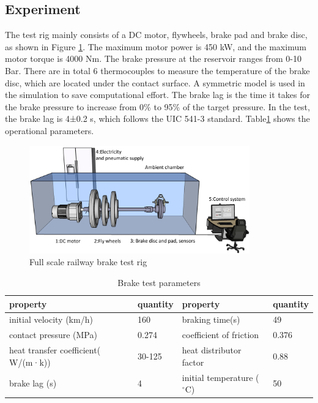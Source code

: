 \subsection*{Experiment}

The test rig mainly consists of a DC motor, flywheels, brake pad and brake disc, as shown in Figure \ref{fig:test rig}. The maximum motor power is 450 kW, and the maximum motor torque is 4000 Nm. The brake pressure at the reservoir ranges from 0-10 Bar. 
There are in total 6 thermocouples to measure the temperature of the brake disc, which are located under the contact surface. A symmetric model is used in the simulation to save computational effort. The brake lag is the time it takes for the brake pressure to increase from 0\% to 95\% of the target pressure. In the test, the brake lag is 4±0.2 s, which follows the UIC 541-3 standard. Table\ref{tab: operational parameters} shows the operational parameters.

\begin{figure}[h]
    \centering
    \includegraphics[width=0.85\textwidth]{book/chapters/zhang/graphics/test_rig.png}
    \caption{Full scale railway brake test rig}
    \label{fig:test rig}
\end{figure}

\begin{table}[h]
    \centering
    \begin{tabular}{llll} %
        \toprule
        \textbf{property} & \textbf{quantity} & \textbf{property} & \textbf{quantity}\\ %
        \midrule
        initial velocity (km/h)             & 160       &braking time(s)          & 49 \\
        contact pressure (MPa)              & 0.274      &coefficient of friction  & 0.376 \\
        heat transfer coefficient( W/(m·k)) & 30-125    &heat distributor factor  & 0.88 \\
        brake lag (s)                       & 4         &initial temperature ($^\circ\text{C}$) & 50\\
       
        \bottomrule
    \end{tabular}
    \caption{Brake test parameters}
    \label{tab: operational parameters}
\end{table}

